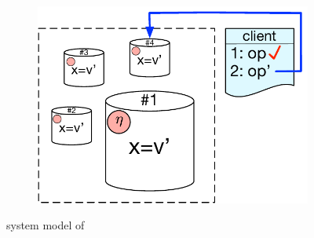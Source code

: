 \begin{figure}[t]
\begin{subfigure}[t]{0.3\textwidth}
        \centering
	\includegraphics[scale=0.32]{Figures/system_model3.pdf}
        \label{fig:sys_model3}
    \end{subfigure}
    \caption{system model of \tool}\label{fig:system_model}
\end{figure}
